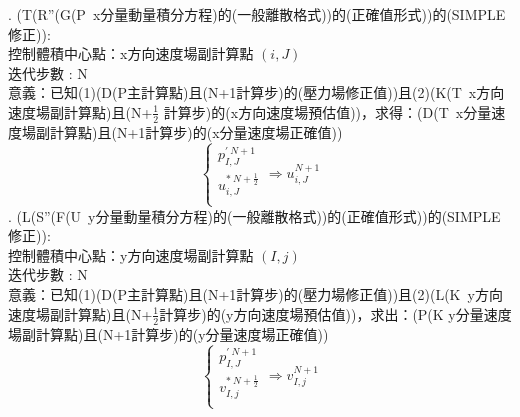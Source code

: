 \documentclass[12pt]{article}
\theoremstyle{upright}
\begin{document}
. \quad  (T(R''(G(P\ x分量動量積分方程)的(一般離散格式))的(正確值形式))的(SIMPLE修正)):\\
\noindent \quad 控制體積中心點：x方向速度場副計算點 $(i,J)$ \\[0.5ex]
\noindent \quad 迭代步數 : N \\[0.5ex]
\noindent \quad 意義：已知(1)(D(P主計算點)且(N+1計算步)的(壓力場修正值))且(2)(K(T\ x方向速度場副計算點)且(N+$\frac{1}{2}$ 計算步)的(x方向速度場預估值))，求得：(D(T\ x分量速度場副計算點)且(N+1計算步)的(x分量速度場正確值))
\[\left\{
\begin{array}{l}p_{I,J}^{\prime\ N+1}\\
    u_{i,J}^{*\ N+\frac{1}{2}}\\
\end{array}\right.
\Rightarrow u_{i,J}^{N+1}\]
. \quad  (L(S''(F(U\ y分量動量積分方程)的(一般離散格式))的(正確值形式))的(SIMPLE修正)):\\
\noindent \quad 控制體積中心點：y方向速度場副計算點 $(I,j)$ \\[0.5ex]
\noindent \quad 迭代步數 : N \\[0.5ex]
\noindent \quad 意義：已知(1)(D(P主計算點)且(N+1計算步)的(壓力場修正值))且(2)(L(K\ y方向速度場副計算點)且(N+$\frac{1}{2}$計算步)的(y方向速度場預估值))，求出：(P(K y分量速度場副計算點)且(N+1計算步)的(y分量速度場正確值))
\[\left\{
\begin{array}{l}p_{I,J}^{\prime\ N+1}\\
    v_{I,j}^{*\ N+\frac{1}{2}}\\
\end{array}\right.
\Rightarrow v_{I,j}^{N+1}\]
\end{document}
